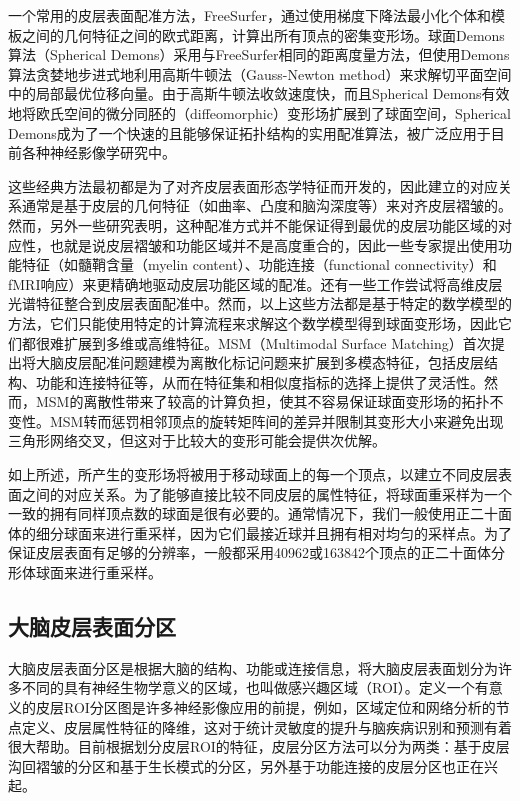 一个常用的皮层表面配准方法，FreeSurfer\cite{fischl1999high}，通过使用梯度下降法最小化个体和模板之间的几何特征之间的欧式距离，计算出所有顶点的密集变形场。球面Demons算法（Spherical Demons）\cite{yeo2009spherical}采用与FreeSurfer相同的距离度量方法，但使用Demons算法\cite{vercauteren2009diffeomorphic}贪婪地步进式地利用高斯牛顿法（Gauss-Newton method）来求解切平面空间中的局部最优位移向量。由于高斯牛顿法收敛速度快，而且Spherical Demons有效地将欧氏空间的微分同胚的（diffeomorphic）变形场扩展到了球面空间，Spherical Demons成为了一个快速的且能够保证拓扑结构的实用配准算法，被广泛应用于目前各种神经影像学研究中。

这些经典方法\cite{yeo2009spherical,fischl1999high,lyu2019hierarchical}最初都是为了对齐皮层表面形态学特征而开发的，因此建立的对应关系通常是基于皮层的几何特征（如曲率、凸度和脑沟深度等）来对齐皮层褶皱的。然而，另外一些研究表明\cite{robinson2014msm,coalson2018impact,glasser2016multi}，这种配准方式并不能保证得到最优的皮层功能区域的对应性，也就是说皮层褶皱和功能区域并不是高度重合的，因此一些专家提出使用功能特征（如髓鞘含量（myelin content）、功能连接（functional connectivity）\cite{conroy2013inter}和fMRI响应\cite{robinson2014msm}）来更精确地驱动皮层功能区域的配准。还有一些工作尝试将高维皮层光谱特征\cite{lombaert2013diffeomorphic}整合到皮层表面配准中。然而，以上这些方法都是基于特定的数学模型的方法，它们只能使用特定的计算流程来求解这个数学模型得到球面变形场，因此它们都很难扩展到多维或高维特征。MSM（Multimodal Surface Matching）\cite{robinson2014msm}首次提出将大脑皮层配准问题建模为离散化标记问题来扩展到多模态特征，包括皮层结构、功能和连接特征等，从而在特征集和相似度指标的选择上提供了灵活性。然而，MSM的离散性带来了较高的计算负担，使其不容易保证球面变形场的拓扑不变性。MSM转而惩罚相邻顶点的旋转矩阵间的差异并限制其变形大小来避免出现三角形网络交叉，但这对于比较大的变形可能会提供次优解。

如上所述，所产生的变形场将被用于移动球面上的每一个顶点，以建立不同皮层表面之间的对应关系。为了能够直接比较不同皮层的属性特征，将球面重采样为一个一致的拥有同样顶点数的球面是很有必要的。通常情况下，我们一般使用正二十面体的细分球面来进行重采样，因为它们最接近球并且拥有相对均匀的采样点\cite{fischl2012freesurfer}。为了保证皮层表面有足够的分辨率，一般都采用40962或163842个顶点的正二十面体分形体球面来进行重采样。


\subsection{大脑皮层表面分区}
大脑皮层表面分区\cite{desikan2006automated}是根据大脑的结构、功能或连接信息，将大脑皮层表面划分为许多不同的具有神经生物学意义的区域，也叫做感兴趣区域（ROI）。定义一个有意义的皮层ROI分区图是许多神经影像应用的前提，例如，区域定位和网络分析的节点定义、皮层属性特征的降维，这对于统计灵敏度的提升与脑疾病识别和预测有着很大帮助。目前根据划分皮层ROI的特征，皮层分区方法可以分为两类：基于皮层沟回褶皱的分区\cite{destrieux2010automatic}和基于生长模式的分区\cite{xia2019fetal}，另外基于功能连接的皮层分区也正在兴起\cite{schaefer2018local}。


